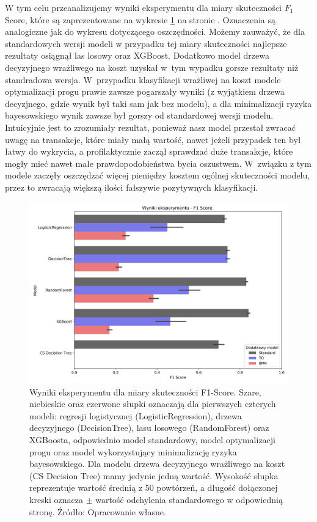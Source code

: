 \documentclass[inzynierska]{pwr_wmat_praca_dyplomowa}
\theoremstyle{plain}
\numberwithin{theorem}{chapter}
\theoremstyle{definition}
\numberwithin{theorem}{chapter}
\begin{document}
W tym celu przeanalizujemy wyniki eksperymentu dla miary skuteczności $F_1$ Score, które są zaprezentowane na wykresie \ref{fig:results-f1} na stronie \pageref{fig:results-savings}. Oznaczenia są analogiczne jak do wykresu dotyczącego oszczędności. Możemy zauważyć, że dla standardowych wersji modeli w przypadku tej miary skuteczności najlepsze rezultaty osiągnął las losowy oraz XGBoost. Dodatkowo model drzewa decyzyjnego wrażliwego na koszt uzyskał w~tym wypadku gorsze rezultaty niż standradowa wersja. W~przypadku klasyfikacji wrażliwej na koszt modele optymalizacji progu prawie zawsze pogarszały wyniki (z wyjątkiem drzewa decyzjnego, gdzie wynik był taki sam jak bez modelu), a dla minimalizacji ryzyka bayesowskiego wynik zawsze był gorszy od standardowej wersji modelu. Intuicyjnie jest to zrozumiały rezultat, ponieważ nasz model przestał zwracać uwagę na transakcje, które miały małą wartość, nawet jeżeli przypadek ten był łatwy do wykrycia, a profilaktycznie zaczął sprawdzać duże transakcje, które mogły mieć nawet małe prawdopodobieństwa bycia oszustwem. W~związku z tym modele zaczęły oszczędzać więcej pieniędzy kosztem ogólnej skuteczności modelu, przez to zwracają większą ilości fałszywie pozytywnych klasyfikacji. 

\begin{figure}[h]
	\includegraphics[width=\linewidth]{images/100_config1-F1.png}
	\caption{Wyniki eksperymentu dla miary skuteczności F1-Score. Szare, niebieskie oraz czerwone słupki oznaczają dla pierwszych czterych modeli: regresji logistycznej (LogisticRegression), drzewa decyzyjnego (DecisionTree), lasu losowego (RandomForest) oraz XGBoosta, odpowiednio model standardowy, model optymalizacji progu oraz model wykorzystujący minimalizację ryzyka bayesowskiego. Dla modelu drzewa decyzyjnego wrażliwego na koszt (CS Decision Tree) mamy jedynie jedną wartość. Wysokość słupka reprezentuje wartość średnią z 50 powtórzeń, a długość dołączonej kreski oznacza $\pm$ wartość odchylenia standardowego w odpowiednią stronę. Źródło: Opracowanie własne.}
	\label{fig:results-f1}
\end{figure}
\end{document}
